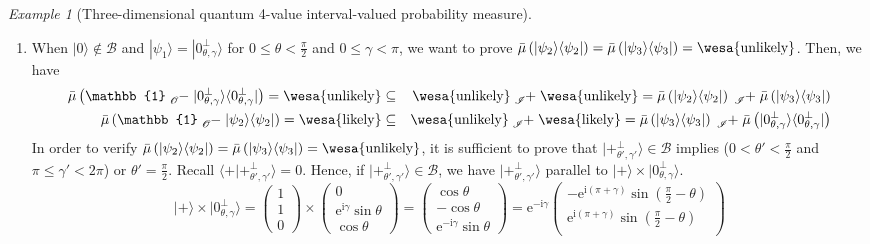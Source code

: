 \documentclass{article}
\theoremstyle{remark}
\newtheorem{example}{Example}
\newcommand{\ket}[1]{|#1\rangle}
\newcommand{\ip}[2]{\langle #1 | #2 \rangle}
\newcommand{\proj}[1]{|#1 \rangle\langle #1 |}
\newcommand{\ps}{\texttt{+}}
\newcommand{\likely}{{\mbox{\wesa{likely}}}}
\newcommand{\unlikely}{{\mbox{\wesa{unlikely}}}}
\newcommand{\rme}{\mathrm{e}}
\newcommand{\rmi}{\mathrm{i}}
\begin{document}
\begin{example}[Three-dimensional quantum 4-value interval-valued
probability measure]
\begin{enumerate}
\begin{eqnarray*}
\end{eqnarray*}
Similarly, when $\ket{\psi_{1}}$ is $\ket{\ps}$, equation (\ref{eq:non-additive-vectors})
holds.
\item When $\ket{0}\notin\mathcal{B}$ and $\ket{\psi_{1}}=\ket{0_{\theta,\gamma}^{\perp}}$
for $0\le\theta<\frac{\pi}{2}$ and $0\le\gamma<\pi$, we want to
prove $\bar{\mu}\left(\proj{\psi_{2}}\right)=\bar{\mu}\left(\proj{\psi_{3}}\right)=\unlikely$.
Then, we have
\begin{eqnarray*}
\bar{\mu}\left(\mathbb{1}\tensor*[_{\mathscr{O}}]{-}{}\proj{0_{\theta,\gamma}^{\perp}}\right)=\unlikely & \subseteq & \unlikely\tensor*[_{\mathscr{I}}]{+}{}\unlikely=\bar{\mu}\left(\proj{\psi_{2}}\right)\tensor*[_{\mathscr{I}}]{+}{}\bar{\mu}\left(\proj{\psi_{3}}\right)\\
\bar{\mu}\left(\mathbb{1}\tensor*[_{\mathscr{O}}]{-}{}\proj{\psi_{2}}\right)=\likely & \subseteq & \unlikely\tensor*[_{\mathscr{I}}]{+}{}\likely=\bar{\mu}\left(\proj{\psi_{3}}\right)\tensor*[_{\mathscr{I}}]{+}{}\bar{\mu}\left(\proj{0_{\theta,\gamma}^{\perp}}\right)
\end{eqnarray*}
In order to verify $\bar{\mu}\left(\proj{\psi_{2}}\right)=\bar{\mu}\left(\proj{\psi_{3}}\right)=\unlikely$,
it is sufficient to prove that $\ket{\ps_{\theta',\gamma'}^{\perp}}\in\mathcal{B}$
implies ($0<\theta'<\frac{\pi}{2}$ and $\pi\le\gamma'<2\pi$) or
$\theta'=\frac{\pi}{2}$. Recall $\ip{\ps}{\ps_{\theta',\gamma'}^{\perp}}=0$.
Hence, if $\ket{\ps_{\theta',\gamma'}^{\perp}}\in\mathcal{B}$, we
have $\ket{\ps_{\theta',\gamma'}^{\perp}}$ parallel to $\ket{\ps}\times\ket{0_{\theta,\gamma}^{\perp}}$.
\[
\ket{\ps}\times\ket{0_{\theta,\gamma}^{\perp}}=\begin{pmatrix}1\\
1\\
0
\end{pmatrix}\times\begin{pmatrix}0\\
\rme^{\rmi\gamma}\sin\theta\\
\cos\theta
\end{pmatrix}=\begin{pmatrix}\cos\theta\\
-\cos\theta\\
\rme^{-\rmi\gamma}\sin\theta
\end{pmatrix}=\rme^{-\rmi\gamma}\begin{pmatrix}-\rme^{\rmi\left(\pi+\gamma\right)}\sin\left(\frac{\pi}{2}-\theta\right)\\
\rme^{\rmi\left(\pi+\gamma\right)}\sin\left(\frac{\pi}{2}-\theta\right)\\

\end{pmatrix}\]
\end{enumerate}
\end{example}
\end{document}
